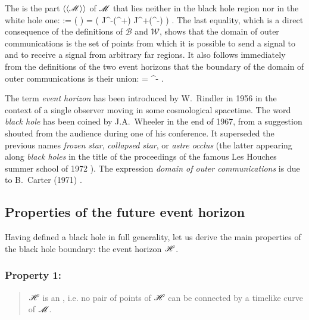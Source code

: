 The 
is the part $\langle\langle \mathscr{M}\rangle\rangle$ of $\mathscr{M}$ that lies neither
in the black hole region nor in the white hole one:
\be
    \langle\langle \M\rangle\rangle := \M\setminus (\cup {} )
            = \left( J^-(\scri^+) \cap J^+(\scri^-) \right) \cap \M .
\ee
The last equality, which is a direct consequence of the definitions of
$\mathscr{B}$ and $\mathscr{W}$, shows that the domain of outer communications
is the set of points from which it is possible to send a signal to and to
receive a signal from arbitrary far regions.
It also follows immediately from the definitions of the two event horizons
that the boundary of the domain of outer communications is their union:
\be
    \partial \langle\langle \M\rangle\rangle  = \Hor \cup \Hor^- .
\ee

\begin{hist}
The term \emph{event horizon} has been introduced by W.~Rindler in 1956 \cite{Rindl56}
in the context of a single observer moving in some cosmological spacetime.
The word \emph{black hole} has been coined by J.A.~Wheeler in the end of 1967,
from a suggestion shouted from the audience during one of his conference.
It superseded the previous names
\emph{frozen star}, \emph{collapsed star}, or \emph{astre occlus}
(the latter appearing along \emph{black holes} in the title of
the proceedings of the famous Les Houches summer school of 1972 \cite{DeWit73}).
The expression \emph{domain of outer communications} is due to B.~Carter
(1971) \cite{Carte71}.
\end{hist}


\subsection{Properties of the future event horizon} \label{s:glo:properties_H}

Having defined a black hole in full generality, let us derive the
main properties of the black hole boundary: the event horizon $\mathscr{H}$.

\subsubsection{Property 1:}
\begin{quote}
$\mathscr{H}$ is an , i.e. no pair of points of $\mathscr{H}$ can be connected
by a timelike curve of $\mathscr{M}$.
\end{quote}

